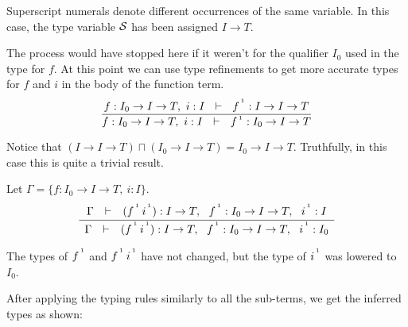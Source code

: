 Superscript numerals denote different occurrences of the same variable.
In this case, the type variable $\S$ has been assigned $I\to T$.

The process would have stopped here if it weren't for the qualifier $I_0$ used in the type for $f$.
At this point we can use type refinements to get more accurate types for $f$ and $i$
in the body of the function term.
%
\newcommand\oops[1]{^{\,^{\mbox{\tiny #1}}}}
\[
\frac{f:I_0\to I\to T, ~ i:I ~~\vdash~~ f\oops1 : I\to I\to T}
     {f:I_0\to I\to T, ~ i:I ~~\vdash~~ f\oops1 : I_0\to I\to T}
 \]
 
Notice that $(I\to I\to T)\sqcap (I_0\to I\to T) = I_0\to I \to T$. Truthfully, in this case this is quite a trivial result.

\smallskip
Let $\Gamma = \{f:I_0\to I\to T, ~ i:I\}$.
%
\[
\frac{\begin{array}{rcl} \Gamma & \vdash & (f\oops1\,i\oops1) : I\to T, 
                                        ~~ f\oops1: I_0\to I\to T,      
                                        ~~ i\oops1 : I                 \end{array}}
     {\begin{array}{rcl} \Gamma & \vdash & (f\oops1\,i\oops1) : I\to T, 
                                        ~~ f\oops1: I_0\to I\to T,      
                                        ~~ i\oops1 : I_0
     \end{array} }
     \]

The types of $f\oops1$ and $f\oops1\,i\oops1$ have not changed, but the type of $i\oops1$ was lowered to $I_0$.

\medskip
After applying the typing rules similarly to all the sub-terms, we get the inferred types as shown:

